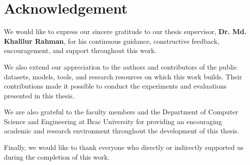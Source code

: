 \section*{Acknowledgement}

We would like to express our sincere gratitude to our thesis supervisor,
\textbf{Dr. Md. Khalilur Rahman}, for his continuous guidance, constructive
feedback, encouragement, and support throughout this work.

We also extend our appreciation to the authors and contributors of the public
datasets, models, tools, and research resources on which this work builds.
Their contributions made it possible to conduct the experiments and evaluations
presented in this thesis.

We are also grateful to the faculty members and the Department of Computer
Science and Engineering at Brac University for providing an encouraging
academic and research environment throughout the development of this thesis.

Finally, we would like to thank everyone who directly or indirectly supported
us during the completion of this work.

\clearpage